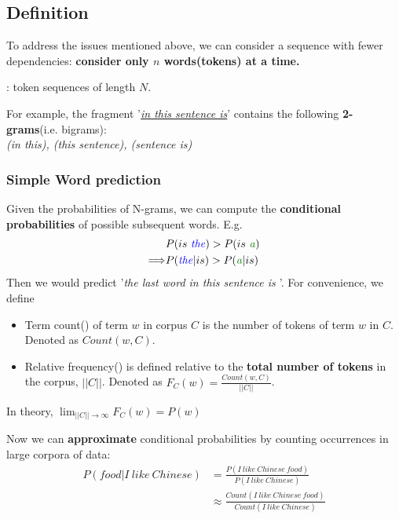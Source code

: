 \documentclass{ainote}
\begin{document}
\subsection{Definition}
To address the issues mentioned above, we can consider a sequence with fewer dependencies: \textbf{consider only $n$ words(tokens) at a time.}
\begin{info}
    {\large{}}: token sequences of length $N$.
\end{info}
For example, the fragment '\textit{\underline{in this sentence is}}' contains the following \textbf{2-grams}(i.e. bigrams):\\
\textit{(in this), (this sentence), (sentence is)}

\subsubsection{Simple Word prediction}
Given the probabilities of N-grams, we can compute the \textbf{conditional probabilities} of possible subsequent words.
{\small E.g.\begin{align*}
    &P(is\ \text{\blue{\textit{the}}}) > P(is\ \text{\green{\textit{a}}})\\
    \Longrightarrow &P(\text{\blue{\textit{the}}}|is) > P(\text{\green{\textit{a}}}|is)
\end{align*}
Then we would predict '\textit{the last word in this sentence is \textbf{}}'.
}
\spskip[1]
For convenience, we define 
\begin{itemize}
    \item Term count() of term $w$ in corpus $C$ is the number of tokens of term $w$ in $C$. Denoted as $Count(w, C)$.
    \item Relative frequency() is defined relative to the \textbf{total number of tokens} in the corpus, $||C||$. Denoted as $F_C(w)=\frac{Count(w,C)}{||C||}$.
\end{itemize}
\begin{supp}
    In theory, $\displaystyle\lim_{||C||\to \infty}F_C(w)=P(w)$
\end{supp}
Now we can \textbf{approximate} conditional probabilities by counting occurrences in large corpora of data:
\begin{align*}
    P(food|I\ like\ Chinese)&=\frac{P(I\ like\ Chinese\ food)}{P(I\ like\ Chinese)}\\
    &\approx \frac{Count(I\ like\ Chinese\ food)}{Count(I\ like\ Chinese)}
\end{align*}
\end{document}
